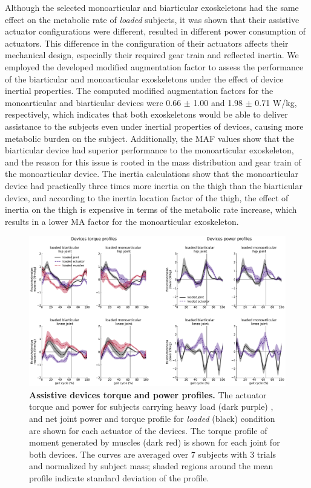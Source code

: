 \documentclass[10pt,letterpaper]{article}
\begin{document}
Although the selected monoarticular and biarticular exoskeletons had the same effect on the metabolic rate of {\it loaded} subjects, it was shown that their assistive actuator configurations were different, resulted in different power consumption of actuators. This difference in the configuration of their actuators affects their mechanical design, especially their required gear train and reflected inertia. We employed the developed modified augmentation factor to assess the performance of the biarticular and monoarticular exoskeletons under the effect of device inertial properties. The computed modified augmentation factors for the monoarticular and biarticular devices were 0.66 $\pm$ 1.00 and  1.98 $\pm$ 0.71 W/kg, respectively, which indicates that both exoskeletons would be able to deliver assistance to the subjects even under inertial properties of devices, causing more metabolic burden on the subject. Additionally, the MAF values show that the biarticular device had superior performance to the monoarticular exoskeleton, and the reason for this issue is rooted in the mass distribution and gear train of the monoarticular device. The inertia calculations show that the monoarticular device had practically three times more inertia on the thigh than the biarticular device, and according to the inertia location factor of the thigh, the effect of inertia on the thigh is expensive in terms of the metabolic rate increase, which results in a lower MA factor for the monoarticular exoskeleton.\\
\begin{figure}[ht]   
	\centering
	\includegraphics[width=\linewidth]{Case_Studies/LoadedMono04_LoadedBi16/PaperFigure_Profiles.pdf}
	\vspace{1mm}
	\caption{{\small\textbf{Assistive devices torque and power profiles.} The actuator torque and power for subjects carrying heavy load (dark purple) , and net joint power and torque profile for \textit{loaded} (black) condition are shown for each actuator of the devices. The torque profile of moment generated by muscles (dark red) is shown for each joint for both devices. The curves are averaged over 7 subjects with 3 trials and normalized by subject mass; shaded regions around the mean profile indicate standard deviation of the profile.}}
	\label{Fig_Case01_Torque_Power_Profiles}
\end{figure}
\end{document}
